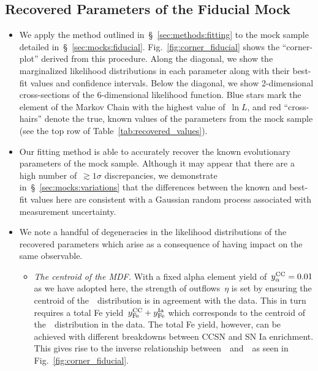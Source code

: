 \documentclass[ms.tex]{subfiles}
\begin{document}
\subsection{Recovered Parameters of the Fiducial Mock}
\label{sec:mocks:fiducial_fit}

\begin{itemize}

	\item We apply the method outlined in~\S~\ref{sec:methods:fitting} to the
	mock sample detailed in~\S~\ref{sec:mocks:fiducial}.
	Fig.~\ref{fig:corner_fiducial} shows the ``corner-plot'' derived from this
	procedure.
	Along the diagonal, we show the marginalized likelihood distributions in
	each parameter along with their best-fit values and confidence intervals.
	Below the diagonal, we show 2-dimensional cross-sections of the
	6-dimensional likelihood function.
	Blue stars mark the element of the Markov Chain with the highest value
	of~$\ln L$, and red ``cross-hairs'' denote the true, known values of the
	parameters from the mock sample (see the top row of
	Table~\ref{tab:recovered_values}).

	\item Our fitting method is able to accurately recover the known
	evolutionary parameters of the mock sample.
	Although it may appear that there are a high number of~$\gtrsim1\sigma$
	discrepancies, we demonstrate in~\S~\ref{sec:mocks:variations} that the
	differences between the known and best-fit values here are consistent with
	a Gaussian random process associated with measurement uncertainty.

	\item We note a handful of degeneracies in the likelihood distributions of
	the recovered parameters which arise as a consequence of having impact on
	the same observable.

	\begin{itemize}

		\item \textit{The centroid of the MDF.}
		With a fixed alpha element yield of~$y_\alpha^\text{CC} = 0.01$ as we have adopted
		here, the strength of outflows~$\eta$ is set by ensuring the centroid
		of the~\ah~distribution is in agreement with the data.
		This in turn requires a total Fe yield~$y_\text{Fe}^\text{CC} + y_\text{Fe}^\text{Ia}$ which
		corresponds to the centroid of the~\feh~distribution in the data.
		The total Fe yield, however, can be achieved with different breakdowns
		between CCSN and SN Ia enrichment.
		This gives rise to the inverse relationship between~\yfecc~and~\yfeia~as
		seen in Fig.~\ref{fig:corner_fiducial}.


\end{itemize}
\end{itemize}
\end{document}
